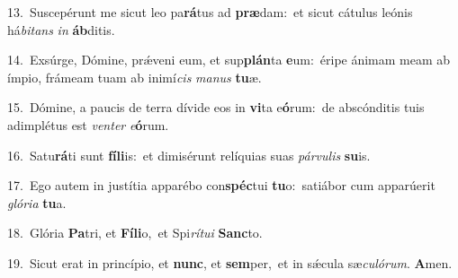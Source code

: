 {\numbfont\textcolor{\numbcolor}{13.}}~Suscepérunt me sicut leo pa\-\textbf{rá}\-tus ad \textbf{præ}\-dam:~\star et sicut cátulus leónis há\-\textit{bi}\-\textit{tans} \textit{in} \textbf{áb}\-ditis.\par
{\numbfont\textcolor{\numbcolor}{14.}}~Exsúrge, Dómine, prǽveni eum, et sup\-\textbf{plán}\-ta \textbf{e}\-um:~\star éripe ánimam meam ab ímpio, frámeam tuam ab inimí\textit{cis} \textit{ma}\-\textit{nus} \textbf{tu}\-æ.\par
{\numbfont\textcolor{\numbcolor}{15.}}~Dómine, a paucis de terra dívide eos in \textbf{vi}\-ta e\-\textbf{ó}\-rum:~\star de abscónditis tuis adimplétus est \textit{ven}\-\textit{ter} \textit{e}\-\textbf{ó}rum.\par
{\numbfont\textcolor{\numbcolor}{16.}}~Satu\-\textbf{rá}\-ti sunt \textbf{fí}\-\textbf{li}is:~\star et dimisérunt relíquias suas \textit{pár}\-\textit{vu}\textit{lis} \textbf{su}\-is.\par
{\numbfont\textcolor{\numbcolor}{17.}}~Ego autem in justítia apparébo con\-\textbf{spéc}\-tui \textbf{tu}\-o:~\star satiábor cum apparúerit \textit{gló}\-\textit{ri}\textit{a} \textbf{tu}\-a.\par
{\numbfont\textcolor{\numbcolor}{18.}}~Glória \textbf{Pa}\-tri, et \textbf{Fí}\-\textbf{li}o,~\star et Spi\-\textit{rí}\-\textit{tu}\textit{i} \textbf{Sanc}\-to.\par
{\numbfont\textcolor{\numbcolor}{19.}}~Sicut erat in princípio, et \textbf{nunc}\-, et \textbf{sem}\-per,~\star et in sǽcula sæ\-\textit{cu}\-\textit{ló}\textit{rum}. \textbf{A}\-men.\par
